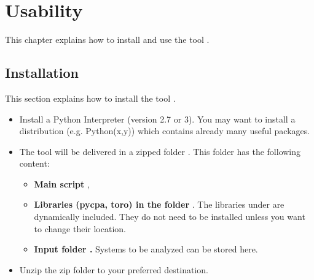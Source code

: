 \section{Usability}
This chapter explains how to install and use the tool \Tool.

\subsection{Installation}
This section explains how to install the tool \Tool.
\begin{itemize}[leftmargin=*]
	\item Install a Python Interpreter (version 2.7 or 3).
				You may want to install a distribution (e.g. Python(x,y)) which contains already many useful packages.
	\item The tool \Tool will be delivered in a zipped folder . 
				This folder has the following content:
				\begin{itemize}
				\item \textbf{Main script }, 
				\item \textbf{Libraries (pycpa, toro) in the folder }.
				The libraries under  are dynamically included. 
				They do not need to be installed unless you want to change their location.
				\item \textbf{Input folder .} Systems to be analyzed can be stored here.
				\end{itemize}
	\item Unzip the zip folder to your preferred destination.	
\end{itemize}


